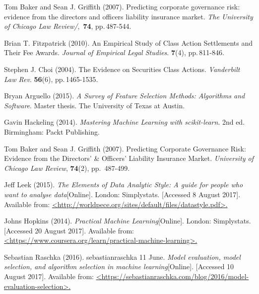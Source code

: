 { Tom Baker and Sean J. Griffith} (2007).
Predicting corporate governance risk: evidence from the directors and officers liability insurance market.  {\em The University of Chicago Law Review/}, \,{\bf 74}, pp.\,487-544.

{ Brian T. Fitzpatrick} (2010).
An Empirical Study of Class Action Settlements and Their Fee Awards. {\em  Journal of Empirical Legal Studies\/}. {\bf 7}(4), pp.\,811-846.

{ Stephen J. Choi} (2004).
The Evidence on Securities Class Actions. {\em Vanderbilt Law Rev\/}. {\bf 56}(6), pp.\,1465-1535.

{ Bryan Arguello} (2015).
 {\em A Survey of Feature Selection Methods: Algorithms and Software\/}. Master thesis. The University of Texas at Austin.
 
{ Gavin Hackeling} (2014).
{\em Mastering Machine Learning with scikit-learn\/}. 2nd ed. Birmingham: Packt Publishing.

{ Tom Baker and Sean J. Griffith} (2007).
Predicting Corporate Governance Risk: Evidence from the Directors' \& Officers' Liability Insurance Market. {\em University of Chicago Law Review\/}, {\bf 74}(2), pp.\, 487-499.

{Jeff Leek} (2015).
 {\em The Elements of Data Analytic Style: A guide for people who want to analyse data\/}[Online]. London: Simplystats. [Accessed 8 August 2017]. Available from: \href{http://worldpece.org/sites/default/files/datastyle.pdf}{\colorbox{Graylight}{<http://worldpece.org/sites/default/files/datastyle.pdf>.}}
 
{Johns Hopkins} (2014).
 {\em Practical Machine Learning\/}[Online]. London: Simplystats. [Accessed 20 August 2017]. Available from: \href{https://www.coursera.org/learn/practical-machine-learning#syllabus}{\colorbox{Graylight}{<https://www.coursera.org/learn/practical-machine-learning>.}}
 
{Sebastian Raschka} (2016). sebastianraschka 11 June.
 {\em Model evaluation, model selection, and algorithm selection in machine learning\/}[Online]. [Accessed 10 August 2017]. Available from: \href{https://sebastianraschka.com/blog/2016/model-evaluation-selection-part1.html}{\colorbox{Graylight}{<https://sebastianraschka.com/blog/2016/model-evaluation-selection>.}}


